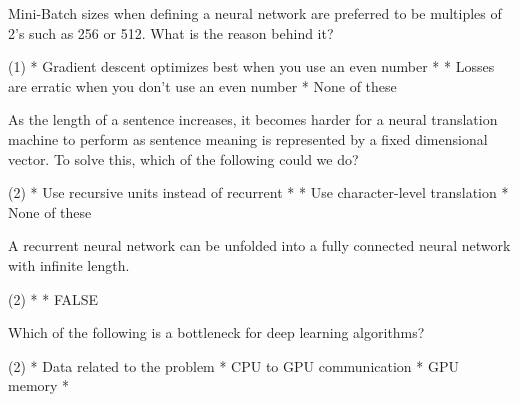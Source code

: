 \documentclass[10pt]{extarticle}
\begin{document}
\begin{exercise}
    Mini-Batch sizes when defining a neural network are preferred to be multiples of 2's such as 256 or 512. What is the reason behind it?
    \begin{choice} (1)
        * Gradient descent optimizes best when you use an even number
        *
        * Losses are erratic when you don't use an even number
        * None of these
    \end{choice}
\end{exercise}
\begin{solution}
\end{solution}

\begin{exercise}
    As the length of a sentence increases, it becomes harder for a neural translation machine to perform as sentence meaning is represented by a fixed dimensional vector. To solve this, which of the following could we do?
    \begin{choice} (2)
        * Use recursive units instead of recurrent
        *
        * Use character-level translation
        * None of these
    \end{choice}
\end{exercise}
\begin{solution}
\end{solution}

\begin{exercise}
    A recurrent neural network can be unfolded into a fully connected neural network with infinite length.
    \begin{choice} (2)
        *
        * FALSE
    \end{choice}
\end{exercise}
\begin{solution}
\end{solution}

\begin{exercise}
    Which of the following is a bottleneck for deep learning algorithms?
    \begin{choice} (2)
        * Data related to the problem
        * CPU to GPU communication
        * GPU memory
        *
    \end{choice}
\end{exercise}
\begin{solution}
\end{solution}
\end{document}
